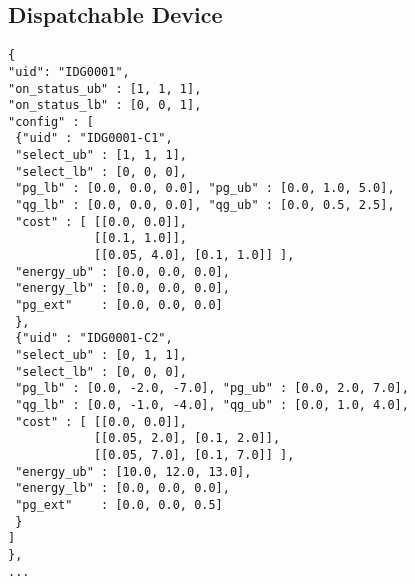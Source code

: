 \subsection{Dispatchable Device}
\label{sec:generator_time}
\begin{verbatim}
{
"uid": "IDG0001",
"on_status_ub" : [1, 1, 1],
"on_status_lb" : [0, 0, 1],
"config" : [
 {"uid" : "IDG0001-C1",
 "select_ub" : [1, 1, 1],
 "select_lb" : [0, 0, 0],
 "pg_lb" : [0.0, 0.0, 0.0], "pg_ub" : [0.0, 1.0, 5.0],
 "qg_lb" : [0.0, 0.0, 0.0], "qg_ub" : [0.0, 0.5, 2.5],
 "cost" : [ [[0.0, 0.0]],
            [[0.1, 1.0]],
            [[0.05, 4.0], [0.1, 1.0]] ],
 "energy_ub" : [0.0, 0.0, 0.0],
 "energy_lb" : [0.0, 0.0, 0.0],
 "pg_ext"    : [0.0, 0.0, 0.0]
 },
 {"uid" : "IDG0001-C2",
 "select_ub" : [0, 1, 1],
 "select_lb" : [0, 0, 0],
 "pg_lb" : [0.0, -2.0, -7.0], "pg_ub" : [0.0, 2.0, 7.0],
 "qg_lb" : [0.0, -1.0, -4.0], "qg_ub" : [0.0, 1.0, 4.0],
 "cost" : [ [[0.0, 0.0]],
            [[0.05, 2.0], [0.1, 2.0]],
            [[0.05, 7.0], [0.1, 7.0]] ],
 "energy_ub" : [10.0, 12.0, 13.0],
 "energy_lb" : [0.0, 0.0, 0.0],
 "pg_ext"    : [0.0, 0.0, 0.5]
 }
]
}, 
... 
\end{verbatim}




